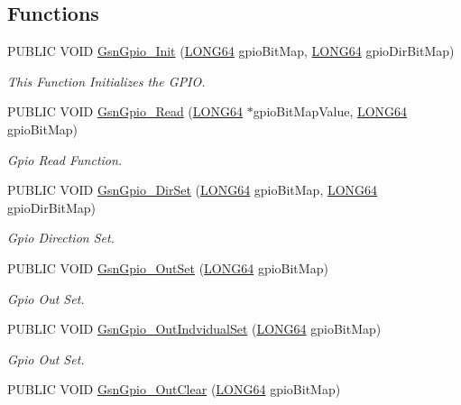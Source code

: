 \subsection*{Functions}
\begin{DoxyCompactItemize}
\item 
PUBLIC VOID \hyperlink{a00648_gaa78f67e1c5700e2d46ba586e2f2e2888}{GsnGpio\_\-Init} (\hyperlink{a00660_gae57305825c7d329ad8a3065ae045e875}{LONG64} gpioBitMap, \hyperlink{a00660_gae57305825c7d329ad8a3065ae045e875}{LONG64} gpioDirBitMap)
\begin{DoxyCompactList}\small\item\em This Function Initializes the GPIO. \end{DoxyCompactList}\item 
PUBLIC VOID \hyperlink{a00648_ga2d626ec26c8ffd4a364baa765eda47bb}{GsnGpio\_\-Read} (\hyperlink{a00660_gae57305825c7d329ad8a3065ae045e875}{LONG64} $\ast$gpioBitMapValue, \hyperlink{a00660_gae57305825c7d329ad8a3065ae045e875}{LONG64} gpioBitMap)
\begin{DoxyCompactList}\small\item\em Gpio Read Function. \end{DoxyCompactList}\item 
PUBLIC VOID \hyperlink{a00648_ga933dbb1d81c4ad5a793bcde69d62893a}{GsnGpio\_\-DirSet} (\hyperlink{a00660_gae57305825c7d329ad8a3065ae045e875}{LONG64} gpioBitMap, \hyperlink{a00660_gae57305825c7d329ad8a3065ae045e875}{LONG64} gpioDirBitMap)
\begin{DoxyCompactList}\small\item\em Gpio Direction Set. \end{DoxyCompactList}\item 
PUBLIC VOID \hyperlink{a00648_gaafee2b2c522249da06678f6f1ee1f965}{GsnGpio\_\-OutSet} (\hyperlink{a00660_gae57305825c7d329ad8a3065ae045e875}{LONG64} gpioBitMap)
\begin{DoxyCompactList}\small\item\em Gpio Out Set. \end{DoxyCompactList}\item 
PUBLIC VOID \hyperlink{a00648_ga1a63f62c863b21f969e07aad3b8b6de7}{GsnGpio\_\-OutIndvidualSet} (\hyperlink{a00660_gae57305825c7d329ad8a3065ae045e875}{LONG64} gpioBitMap)
\begin{DoxyCompactList}\small\item\em Gpio Out Set. \end{DoxyCompactList}\item 
PUBLIC VOID \hyperlink{a00648_ga39b91b13276fa91305f7fc7374251311}{GsnGpio\_\-OutClear} (\hyperlink{a00660_gae57305825c7d329ad8a3065ae045e875}{LONG64} gpioBitMap)

\end{DoxyCompactItemize}
